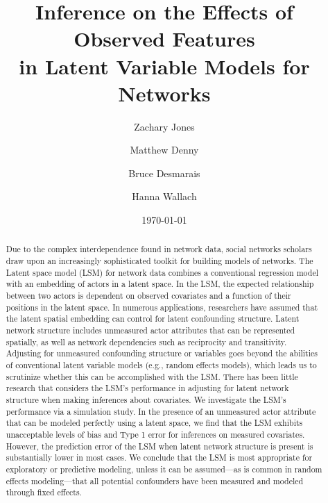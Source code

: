 \documentclass[11pt]{article}
\title{\vspace{-2cm} Inference on the Effects of Observed Features
\\ in Latent Variable Models for Networks }
\author{ Zachary Jones \and Matthew Denny \and Bruce Desmarais \and Hanna Wallach} \date{\today}
\begin{document}
\maketitle




\begin{abstract}

\noindent Due to the complex interdependence found in network data,
social networks scholars draw upon an increasingly sophisticated
toolkit for building models of networks. The Latent space model (LSM) for
network data combines a conventional regression model with an embedding of actors in a latent space. In the LSM, the expected relationship between two actors is dependent on observed covariates and a function of their positions in the latent space. In numerous applications, researchers have assumed
that the latent spatial embedding can control for latent
confounding structure. Latent network structure includes unmeasured actor attributes that can be represented spatially, as well as network dependencies such as reciprocity and transitivity.  Adjusting for unmeasured confounding structure or variables goes beyond the abilities of conventional latent variable models (e.g., random effects models), which leads us to scrutinize whether this can be accomplished with the LSM. There has been little research that considers the LSM's
performance in adjusting for latent network structure when making inferences about covariates. We investigate the
LSM's performance via a simulation study. In the presence of an
unmeasured actor attribute that can be modeled perfectly using a latent space,
we find that the LSM exhibits unacceptable levels of bias and Type 1 error for inferences on measured covariates. However, the prediction error of the LSM when latent network structure is present is substantially lower in most cases. We
conclude that the LSM is most appropriate for exploratory or predictive modeling, unless it can be assumed---as is common in random effects modeling---that all potential confounders have been measured and modeled through fixed effects.
\end{abstract}
\thispagestyle{empty}
\end{document}
